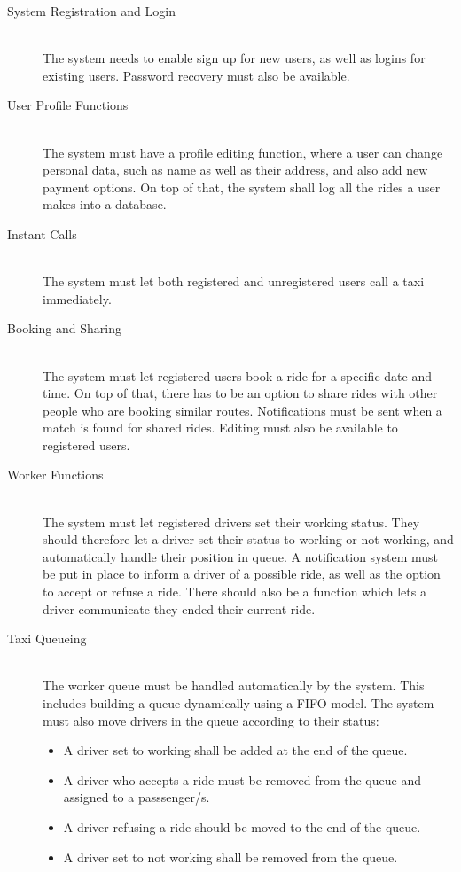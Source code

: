 \begin{description}

        \item[System Registration and Login] \hfill \\
		The system needs to enable sign up for new users, as well as logins for existing users. Password recovery must also be available.
        \item[User Profile Functions] \hfill \\
		The system must have a profile editing function, where a user can change personal data, such as name as well as their address,
		and also add new payment options. On top of that, the system shall log all the rides a user makes into a database.
		\item[Instant Calls] \hfill \\
		The system must let both registered and unregistered users call a taxi immediately.
		\item[Booking and Sharing] \hfill \\
		The system must let registered users book a ride for a specific date and time. On top of that, there has to be an option to share
		rides with other people who are booking similar routes. Notifications must be sent when a match is found for shared rides. Editing must
		also be available to registered users.
		\item[Worker Functions] \hfill \\
		The system must let registered drivers set their working status. They should therefore let a driver set their status to working or not
		working, and automatically handle their position in queue. A notification system must be put in place to inform a driver of a possible
		ride, as well as the option to accept or refuse a ride.	There should also be a function which lets a driver communicate they ended their
		current ride.
		\item[Taxi Queueing] \hfill \\
		The worker queue must be handled automatically by the system. This includes building a queue dynamically using a FIFO model. The system
		must also move drivers in the queue according to their status:
			\begin{itemize}
				\item A driver set to working shall be added at the end of the queue.
				\item A driver who accepts a ride must be removed from the queue and assigned to a passsenger/s.
				\item A driver refusing a ride should be moved to the end of the queue.
				\item A driver set to not working shall be removed from the queue.
			\end{itemize}

\end{description}
\newpage
